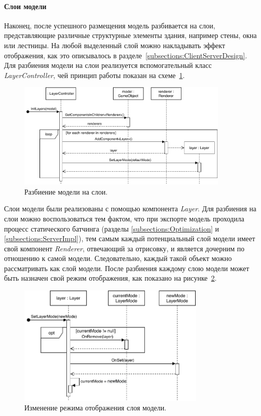 ﻿\paragraph{Слои модели}

Наконец, после успешного размещения модель разбивается на слои,
представляющие различные структурные элементы здания,
например стены, окна или лестницы. На любой выделенный слой
можно накладывать эффект отображения, как это описывалось
в разделе~\ref{subsections:ClientServerDesign}.
Для разбиения модели на слои реализуется вспомогательный класс
\emph{LayerController}, чей принцип работы показан
на схеме~\ref{figure:SInitLayers}.

\begin{figure}[!htp]
    \centering
    \includegraphics[width=0.9\textwidth]{images/UML-SInitLayers.pdf}
    \caption{Разбиение модели на слои.}
    \label{figure:SInitLayers}
\end{figure}

Слои модели были реализованы с помощью компонента \emph{Layer}.
Для разбиения на слои можно воспользоваться тем фактом,
что при экспорте модель проходила процесс статического батчинга
(разделы \ref{subsections:Optimization} и \ref{subsections:ServerImpl}),
тем самым каждый потенциальный слой модели имеет свой компонент \emph{Renderer},
отвечающий за отрисовку, и является дочерним по отношению к самой модели.
Следовательно, каждый такой объект можно рассматривать как слой модели.
После разбиения каждому слою модели может быть назначен
свой режим отображения, как показано на рисунке~\ref{figure:SLayerSetMode}.

\begin{figure}[!htp]
    \centering
    \includegraphics[width=0.8\textwidth]{images/UML-SLayerSetMode.pdf}
    \caption{Изменение режима отображения слоя модели.}
    \label{figure:SLayerSetMode}
\end{figure}

